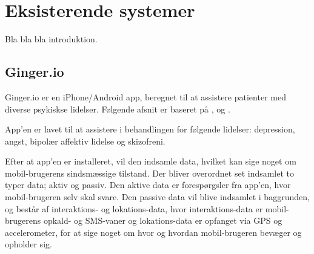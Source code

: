 \section{Eksisterende systemer}
Bla bla bla introduktion.

\subsection{Ginger.io}
Ginger.io er en iPhone/Android app, beregnet til at assistere patienter med diverse psykiskse lidelser.
Følgende afsnit er baseret på \cite{ginger_dot_io}, \cite{gingerio_mit} og \cite{gingerio_dailymail}.


App'en er lavet til at assistere i behandlingen for følgende lidelser: depression, angst, bipolær affektiv lidelse og skizofreni.

Efter at app'en er installeret, vil den indsamle data, hvilket kan sige noget om mobil-brugerens sindsmæssige tilstand.
Der bliver overordnet set indsamlet to typer data; aktiv og passiv.
Den aktive data er forespørgsler fra app'en, hvor mobil-brugeren selv skal svare.
Den passive data vil blive indsamlet i baggrunden, og består af interaktions- og lokations-data, hvor interaktions-data er mobil-brugerens opkald- og SMS-vaner og lokations-data er opfanget via GPS og accelerometer, for at sige noget om hvor og hvordan mobil-brugeren bevæger og opholder sig.

